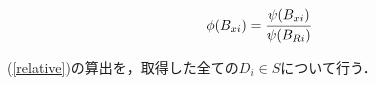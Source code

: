 \documentclass[a4paper,10pt,twocolumn]{jsarticle}
\begin{document}
\begin{equation}
  \phi(B_{xi}) = \cfrac{\psi(B_{xi})}{\psi(B_{Ri})}\label{relative}
\end{equation}

(\ref{relative})の算出を，取得した全ての$D_i \in S$について行う．
\end{document}
